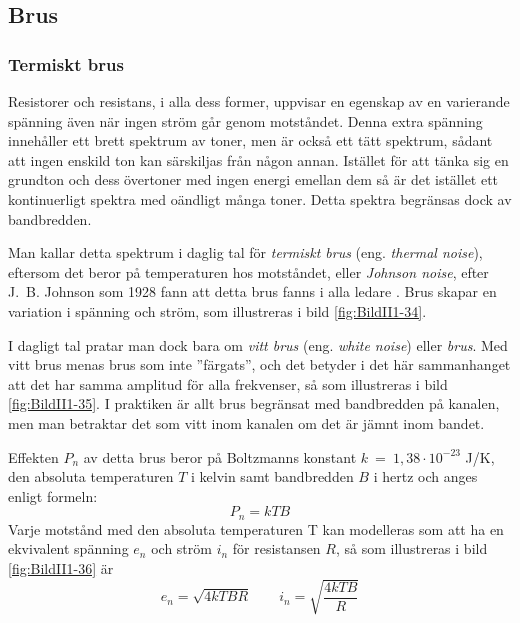 \subsection{Brus}
\label{termisktbrus}

\subsubsection{Termiskt brus}

Resistorer och resistans, i alla dess former, uppvisar en egenskap av
en varierande spänning även när ingen ström går genom motståndet.
Denna extra spänning innehåller ett brett spektrum av toner, men är också ett
tätt spektrum, sådant att ingen enskild ton kan särskiljas från någon annan.
Istället för att tänka sig en grundton och dess övertoner med ingen energi
emellan dem så är det istället ett kontinuerligt spektra med oändligt många
toner.
Detta spektra begränsas dock av bandbredden.




Man kallar detta spektrum i daglig tal för \emph{termiskt brus}
(eng. \emph{thermal noise}), eftersom det beror på temperaturen hos motståndet,
eller \emph{Johnson noise}, efter J.~B. Johnson som 1928 fann att detta brus
fanns i alla ledare \cite{ott1988}.
Brus skapar en variation i spänning och ström, som illustreras i bild
\ref{fig:BildII1-34}.

I dagligt tal pratar man dock bara om \emph{vitt brus} (eng.
\emph{white noise}) eller \emph{brus}.
Med vitt brus menas brus som inte ''färgats'', och det betyder i det här
sammanhanget att det har samma amplitud för alla frekvenser, så som illustreras
i bild \ref{fig:BildII1-35}.
I praktiken är allt brus begränsat med bandbredden på kanalen, men man
betraktar det som vitt inom kanalen om det är jämnt inom bandet.

Effekten \(P_n\) av detta brus beror på Boltzmanns konstant
\(k\ =\ 1,38 \cdot 10^{-23}\) J/K, den absoluta temperaturen \(T\) i
kelvin samt bandbredden \(B\) i hertz och anges enligt formeln:
\[P_n = k T B\]
Varje motstånd med den absoluta temperaturen T kan modelleras som att ha en
ekvivalent spänning \(e_n\) och ström \(i_n\) för resistansen \(R\),
så som illustreras i bild \ref{fig:BildII1-36} är
\[e_n = \sqrt{4kTBR}\qquad i_n = \sqrt{\dfrac{4kTB}{R}}\]
